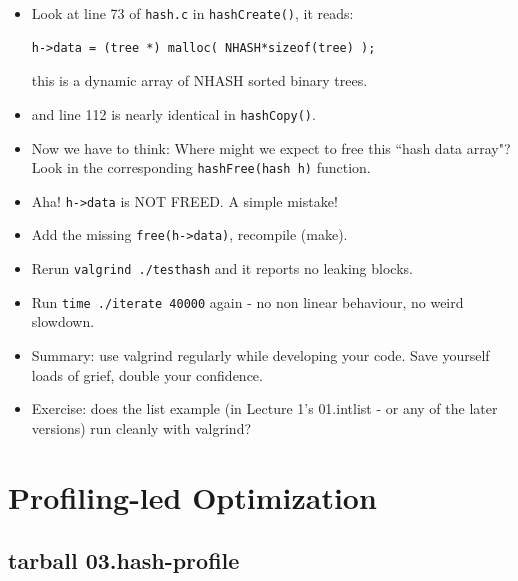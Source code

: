 \documentclass[handout]{beamer}
\newcommand{\pitem}{\pause \item}
\begin{document}
\begin{frame}[fragile]
    \begin{itemize}
       \item
       Look at line 73 of \verb+hash.c+ in \verb+hashCreate()+, it reads:

\begin{verbatim}
h->data = (tree *) malloc( NHASH*sizeof(tree) );
\end{verbatim}

       this is a dynamic array of NHASH sorted binary trees.

       \item and line 112 is nearly identical in \verb+hashCopy()+.

  \pitem
  Now we have to think: Where might we expect to free this ``hash data array"?
  \pause
  Look in the corresponding \verb+hashFree(hash h)+ function.

  \pitem Aha!  \verb+h->data+ is NOT FREED.  A simple mistake!

  \item Add the missing \verb+free(h->data)+, recompile (make).
  \pitem Rerun \verb+valgrind ./testhash+ and it reports no leaking blocks.
  \item Run \verb+time ./iterate 40000+ again - no non linear behaviour,
  no weird slowdown.

    \pause
    \item
      Summary: \alert{use valgrind regularly while developing your code}.
      Save yourself loads of grief, double your confidence.
    \item
      Exercise: does the list example (in
      Lecture 1's \alert{01.intlist} - or any of the later versions)
      run cleanly with valgrind?
    \end{itemize}
\end{frame}

\section{Profiling-led Optimization}
\subsection{tarball 03.hash-profile}
\end{document}
